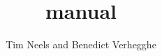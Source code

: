 \documentclass[a4paper]{manual}
\title{\pyformex manual}
\author{Tim Neels and Benedict Verhegghe}
\begin{document}
\maketitle
\begin{titlepage}
~
\end{titlepage}
\thispagestyle{empty}
\begin{latexonly}
  \tableofcontents
\end{latexonly}








\appendix


\printindex%
\end{document}
